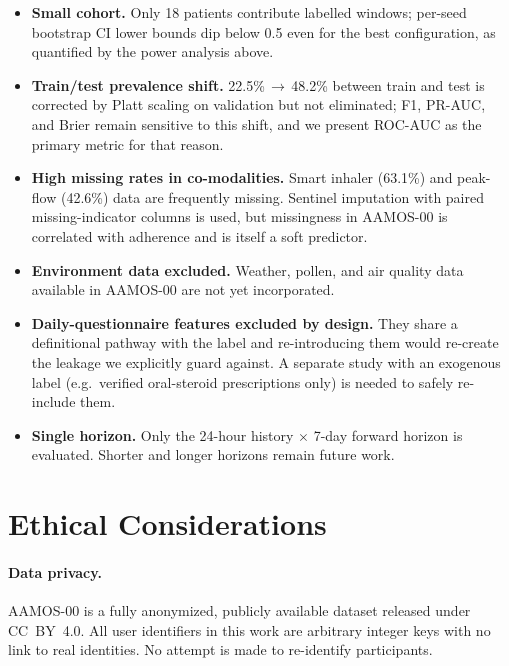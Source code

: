 \documentclass[11pt,a4paper]{article}
\begin{document}
\begin{itemize}[nosep]
  \item \textbf{Small cohort.}  Only 18 patients contribute labelled
        windows; per-seed bootstrap CI lower bounds dip below 0.5 even
        for the best configuration, as quantified by the power analysis
        above.

  \item \textbf{Train/test prevalence shift.}  22.5\%\,$\to$\,48.2\%
        between train and test is corrected by Platt scaling on
        validation but not eliminated; F1, PR-AUC, and Brier remain
        sensitive to this shift, and we present ROC-AUC as the primary
        metric for that reason.

  \item \textbf{High missing rates in co-modalities.}  Smart inhaler
        (63.1\%) and peak-flow (42.6\%) data are frequently missing.
        Sentinel imputation with paired missing-indicator columns is
        used, but missingness in AAMOS-00 is correlated with adherence
        and is itself a soft predictor.

  \item \textbf{Environment data excluded.}  Weather, pollen, and air
        quality data available in AAMOS-00 are not yet incorporated.

  \item \textbf{Daily-questionnaire features excluded by design.}  They
        share a definitional pathway with the label and re-introducing
        them would re-create the leakage we explicitly guard against.
        A separate study with an exogenous label (e.g.\ verified
        oral-steroid prescriptions only) is needed to safely re-include
        them.

  \item \textbf{Single horizon.}  Only the 24-hour history $\times$
        7-day forward horizon is evaluated.  Shorter and longer
        horizons remain future work.
\end{itemize}

\section{Ethical Considerations}\label{sec:ethics}

\paragraph{Data privacy.}
AAMOS-00 is a fully anonymized, publicly available dataset released under
CC~BY~4.0.  All user identifiers in this work are arbitrary integer keys with
no link to real identities.  No attempt is made to re-identify participants.
\end{document}
